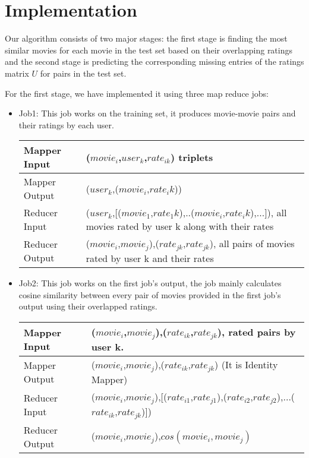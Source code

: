 \section{Implementation}
Our algorithm consists of two major stages: the first stage is finding
the most similar movies for each movie in the test set based on their
overlapping ratings and the second stage is predicting the
corresponding missing entries of the ratings matrix $U$ for pairs in
the test set.

For the first stage, we have implemented it using three map reduce
jobs:\\
\begin{itemize}
\item Job1: This job works on the training set, it produces
  movie-movie pairs and their ratings by each user.

  \begin{tabular}{|l|p{10cm}|}
      \hline
      Mapper Input & ($movie_i$,$user_k$,$rate_{ik}$) triplets\\
      \hline
      Mapper Output & ($user_k$,($movie_i$,$rate_ik$))\\
      \hline
      Reducer Input & ($user_k$,[($movie_1$,$rate_1k$),..($movie_i$,$rate_ik$),...]), all movies rated by user k along with their rates\\
      \hline
      Reducer Output & ($movie_i$,$movie_j$),($rate_{jk}$,$rate_{jk}$), all pairs of movies rated by user k and their rates\\
      \hline
  \end{tabular}
  
\item Job2: This job works on the first job's output, the job mainly
  calculates cosine similarity between every pair of movies provided
  in the first job's output using their overlapped ratings.

  \begin{tabular}{|l|p{10cm}|}
    \hline
    Mapper Input & ($movie_i$,$movie_j$),($rate_{ik}$,$rate_{jk}$), rated pairs by user k.\\
    \hline
    Mapper Output & ($movie_i$,$movie_j$),($rate_{ik}$,$rate_{jk}$) (It is Identity Mapper)\\
    \hline
    Reducer Input & ($movie_i$,$movie_j$),[($rate_{i1}$,$rate_{j1}$),($rate_{i2}$,$rate_{j2}$),...($rate_{ik}$,$rate_{jk}$)])\\
    \hline
    Reducer Output & ($movie_i$,$movie_j$),$cos(movie_i,movie_j)$\\
    \hline
  \end{tabular}
  

\end{itemize}
